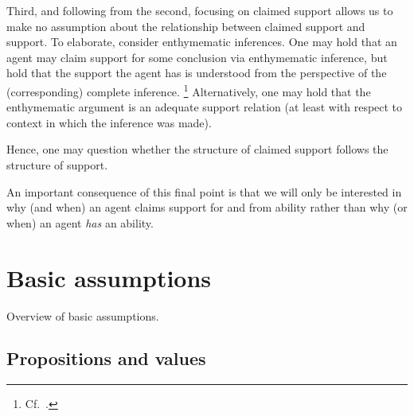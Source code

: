 \begin{note}
  Third, and following from the second, focusing on claimed support allows us to make no assumption about the relationship between claimed support and support.
  To elaborate, consider enthymematic inferences.
  One may hold that an agent may claim support for some conclusion via enthymematic inference, but hold that the support the agent has is understood from the perspective of the (corresponding) complete inference.\nolinebreak
  \footnote{
    Cf.\ \textcite{Moretti:2019wx}.
  }
  Alternatively, one may hold that the enthymematic argument is an adequate support relation (at least with respect to context in which the inference was made).

  Hence, one may question whether the structure of claimed support follows the structure of support.

  An important consequence of this final point is that we will only be interested in why (and when) an agent claims support for and from ability rather than why (or when) an agent \emph{has} an ability.
\end{note}

\section{Basic assumptions}
\label{sec:basic-assumptions}

\begin{note}
  Overview of basic assumptions.
\end{note}


\subsection{Propositions and values}
\label{sec:basic-assumptions:props-and-vals}

